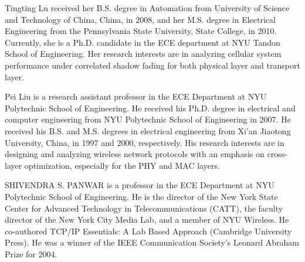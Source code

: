 \documentclass[journal,10pt]{IEEEtran}
\begin{document}
%
%
%
%
%
%
%



\ifCLASSOPTIONcaptionsoff
  \newpage
\fi




\begin{IEEEbiography}{Tingting Lu}
received her B.S. degree in Automation from University of Science and Technology of China, 
China, in 2008, and her M.S. degree in Electrical Engineering from the Pennsylvania State University, 
State College, in 2010. Currently, she is a Ph.D. candidate in the ECE department at NYU 
Tandon School of Engineering. Her research interests are in analyzing cellular system performance 
under correlated shadow fading for both physical layer and transport layer.
\end{IEEEbiography}
\begin{IEEEbiography}{Pei Liu}
is a research assistant professor in the ECE Department
at NYU Polytechnic School of Engineering. He
received his Ph.D. degree in electrical and computer engineering
from NYU Polytechnic School of Engineering in
2007. He received his B.S. and M.S. degrees in electrical
engineering from Xi'an Jiaotong University, China, in 1997
and 2000, respectively. His research interests are in designing
and analyzing wireless network protocols with an
emphasis on cross-layer optimization, especially for the
PHY and MAC layers.
\end{IEEEbiography}
\begin{IEEEbiography}{SHIVENDRA S. PANWAR}
 is a professor in the ECE Department
at NYU Polytechnic School of Engineering. He is the
director of the New York State Center for Advanced Technology
in Telecommunications (CATT), the faculty director
of the New York City Media Lab, and a member of NYU
Wireless. He co-authored TCP/IP Essentials: A Lab Based
Approach (Cambridge University Press). He was a winner of
the IEEE Communication Society's Leonard Abraham Prize
for 2004.
\end{IEEEbiography}
\end{document}
